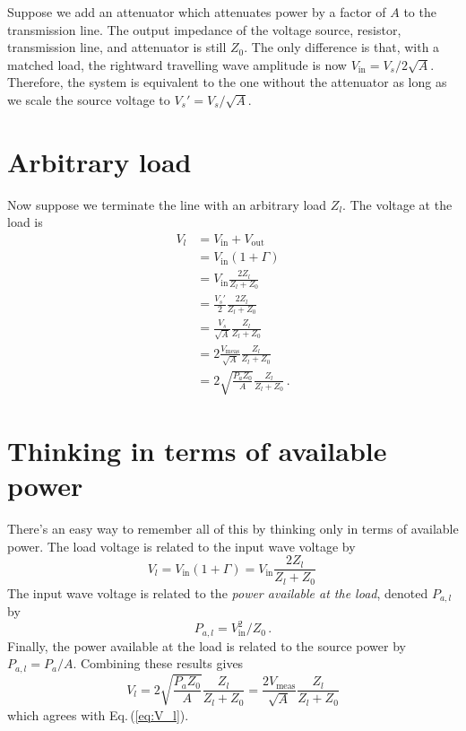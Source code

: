 \documentclass[twocolumn]{article}
\begin{document}
Suppose we add an attenuator which attenuates power by a factor of $A$ to the transmission line.
The output impedance of the voltage source, resistor, transmission line, and attenuator is still $Z_0$.
The only difference is that, with a matched load, the rightward travelling wave amplitude is now $V_\text{in} = V_s/2\sqrt{A}$.
Therefore, the system is equivalent to the one without the attenuator as long as we scale the source voltage to $V_s'=V_s / \sqrt{A}$.

\section{Arbitrary load}

Now suppose we terminate the line with an arbitrary load $Z_l$.
The voltage at the load is
\begin{align}
V_l
&= V_{\text{in}} + V_{\text{out}} \\
&= V_{\text{in}} (1 + \Gamma) \\
&= V_{\text{in}} \frac{2 Z_l}{Z_l + Z_0} \\
&= \frac{V_s'}{2} \frac{2 Z_l}{Z_l + Z_0} \\
&= \frac{V_s}{\sqrt{A}} \frac{Z_l}{Z_l + Z_0} \\
&= 2 \frac{V_{\text{meas}}}{\sqrt{A}} \frac{Z_l}{Z_l + Z_0} \\
&= 2 \sqrt{\frac{P_a Z_0}{A}} \frac{Z_l}{Z_l + Z_0} \, . \label{eq:V_l}
\end{align}

\section{Thinking in terms of available power}

There's an easy way to remember all of this by thinking only in terms of available power.
The load voltage is related to the input wave voltage by
\begin{equation}
V_l = V_{\text{in}}(1 + \Gamma) = V_{\text{in}} \frac{2 Z_l}{Z_l + Z_0} \,
\end{equation}
The input wave voltage is related to the \emph{power available at the load}, denoted $P_{a,l}$ by
\begin{equation}
P_{a,l} = V_{\text{in}}^2 / Z_0 \, .
\end{equation}
Finally, the power available at the load is related to the source power by $P_{a,l} = P_a / A$.
Combining these results gives
\begin{equation}
V_l = 2 \sqrt{\frac{P_a Z_0}{A}} \frac{Z_l}{Z_l + Z_0} = \frac{2 V_\text{meas}}{\sqrt{A}} \frac{Z_l}{Z_l + Z_0}
\end{equation}
which agrees with Eq.\,(\ref{eq:V_l}).
\end{document}

